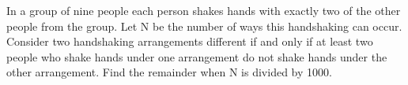 In a group of nine people each person shakes hands with exactly two of the other people from the group. Let N be the number of ways this handshaking can occur. Consider two handshaking arrangements different if and only if at least two people who shake hands under one arrangement do not shake hands under the other arrangement. Find the remainder when N is divided by 1000.
